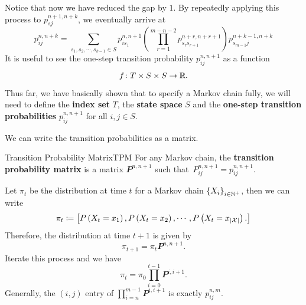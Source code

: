 \documentclass[math, code]{amznotes}
\theoremstyle{remark}
\begin{document}
Notice that now we have reduced the gap by $1$. By repeatedly applying this process to $p_{sj}^{n + 1, n + k}$, we eventually arrive at 
\begin{equation*}
    p_{ij}^{n, n + k} = \sum_{s_1, s_2, \cdots, s_{k - 1} \in S}p_{is_1}^{n, n + 1}\left(\prod_{r = 1}^{m - n - 2}p_{s_rs_{r + 1}}^{n + r, n + r + 1}\right)p_{s_{m - 1}j}^{n + k - 1, n + k}
\end{equation*}
It is useful to see the one-step transition probability $p_{ij}^{n, n + 1}$ as a function 
\begin{equation*}
    f \colon T \times S \times S \to \mathbb{R}.
\end{equation*}
Thus far, we have basically shown that to specify a Markov chain fully, we will need to define the \textbf{index set} $T$, the \textbf{state space} $S$ and the \textbf{one-step transition probabilities} $p_{ij}^{n, n + 1}$ for all $i, j \in S$. 

We can write the transition probabilities as a matrix.
\begin{dfnbox}{Transition Probability Matrix}{TPM}
    For any Markov chain, the {\color{red} \textbf{transition probability matrix}} is a matrix $\mathbfit{P}^{n, n + 1}$ such that~$P^{n, n + 1}_{ij} = p_{ij}^{n, n + 1}$.
\end{dfnbox}
Let $\pi_t$ be the distribution at time $t$ for a Markov chain $\left\{X_i\right\}_{i \in \mathbb{N}^+}$, then we can write 
\begin{equation*}
    \pi_t \coloneqq \begin{bmatrix}
        P\left(X_t = x_1\right), P\left(X_t = x_2\right), \cdots, P\left(X_t = x_{{\left\lvert {\mathcal{X}} \right\rvert}}\right).
    \end{bmatrix}
\end{equation*}
Therefore, the distribution at time $t + 1$ is given by 
\begin{equation*}
    \pi_{t + 1} = \pi_t\mathbfit{P}^{n, n + 1}.
\end{equation*}
Iterate this process and we have 
\begin{equation*}
    \pi_t = \pi_0\prod_{i = 0}^{t - 1}\mathbfit{P}^{i, i + 1}.
\end{equation*}
Generally, the $\left(i, j\right)$ entry of $\prod_{i = n}^{m - 1}\mathbfit{P}^{i, i + 1}$ is exactly $p_{ij}^{n, m}$.
\end{document}
